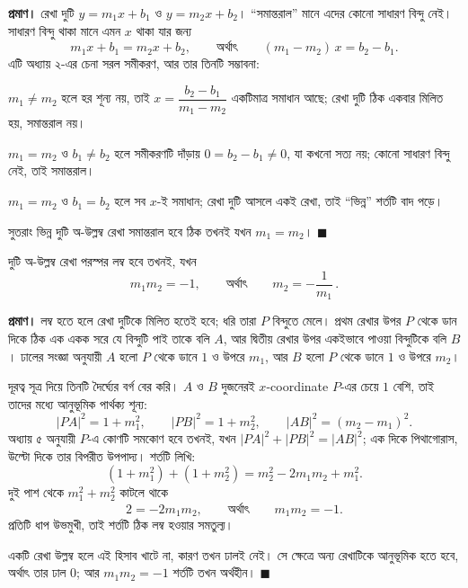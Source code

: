 \documentclass[11pt]{article}
\begin{document}
\noindent
\textbf{প্রমাণ।} রেখা দুটি $y = m_1 x + b_1$ ও $y = m_2 x + b_2$। ``সমান্তরাল''
মানে এদের কোনো সাধারণ বিন্দু নেই। সাধারণ বিন্দু থাকা মানে এমন $x$ থাকা যার
জন্য
\[
  m_1 x + b_1 = m_2 x + b_2 ,
  \qquad \text{অর্থাৎ} \qquad
  (m_1 - m_2)\,x = b_2 - b_1 .
\]
এটি অধ্যায় ২-এর চেনা সরল সমীকরণ, আর তার তিনটি সম্ভাবনা:

$m_1 \neq m_2$ হলে হর শূন্য নয়, তাই $x = \dfrac{b_2 - b_1}{m_1 - m_2}$ একটিমাত্র
সমাধান আছে; রেখা দুটি ঠিক একবার মিলিত হয়, সমান্তরাল নয়।

$m_1 = m_2$ ও $b_1 \neq b_2$ হলে সমীকরণটি দাঁড়ায় $0 = b_2 - b_1 \neq 0$, যা
কখনো সত্য নয়; কোনো সাধারণ বিন্দু নেই, তাই সমান্তরাল।

$m_1 = m_2$ ও $b_1 = b_2$ হলে সব $x$-ই সমাধান; রেখা দুটি আসলে একই রেখা, তাই
``ভিন্ন'' শর্তটি বাদ পড়ে।

সুতরাং ভিন্ন দুটি অ-উল্লম্ব রেখা সমান্তরাল হবে ঠিক তখনই যখন $m_1 = m_2$।
$\blacksquare$

\begin{idea}[লম্বের শর্ত]
দুটি অ-উল্লম্ব রেখা পরস্পর লম্ব হবে তখনই, যখন
\[
  m_1 m_2 = -1 , \qquad \text{অর্থাৎ} \qquad m_2 = -\frac{1}{m_1}\,.
\]
\end{idea}

\noindent
\textbf{প্রমাণ।} লম্ব হতে হলে রেখা দুটিকে মিলিত হতেই হবে; ধরি তারা $P$ বিন্দুতে
মেলে। প্রথম রেখার উপর $P$ থেকে ডান দিকে ঠিক এক একক সরে যে বিন্দুটি পাই তাকে
বলি $A$, আর দ্বিতীয় রেখার উপর একইভাবে পাওয়া বিন্দুটিকে বলি $B$। ঢালের
সংজ্ঞা অনুযায়ী $A$ হলো $P$ থেকে ডানে $1$ ও উপরে $m_1$, আর $B$ হলো $P$ থেকে
ডানে $1$ ও উপরে $m_2$।

দূরত্ব সূত্র দিয়ে তিনটি দৈর্ঘ্যের বর্গ বের করি। $A$ ও $B$ দুজনেরই
$x$-coordinate $P$-এর চেয়ে $1$ বেশি, তাই তাদের মধ্যে আনুভূমিক পার্থক্য শূন্য:
\[
  |PA|^2 = 1 + m_1^2 , \qquad
  |PB|^2 = 1 + m_2^2 , \qquad
  |AB|^2 = (m_2 - m_1)^2 .
\]
অধ্যায় ৫ অনুযায়ী $P$-এ কোণটি সমকোণ হবে তখনই, যখন
$|PA|^2 + |PB|^2 = |AB|^2$; এক দিকে পিথাগোরাস, উল্টো দিকে তার বিপরীত উপপাদ্য।
শর্তটি লিখি:
\[
  (1 + m_1^2) + (1 + m_2^2) = m_2^2 - 2 m_1 m_2 + m_1^2 .
\]
দুই পাশ থেকে $m_1^2 + m_2^2$ কাটলে থাকে
\[
  2 = -2 m_1 m_2 , \qquad \text{অর্থাৎ} \qquad m_1 m_2 = -1 .
\]
প্রতিটি ধাপ উভমুখী, তাই শর্তটি ঠিক লম্ব হওয়ার সমতুল্য।

একটি রেখা উল্লম্ব হলে এই হিসাব খাটে না, কারণ তখন ঢালই নেই। সে ক্ষেত্রে অন্য
রেখাটিকে আনুভূমিক হতে হবে, অর্থাৎ তার ঢাল $0$; আর $m_1 m_2 = -1$ শর্তটি তখন
অর্থহীন। $\blacksquare$

\begin{center}
\end{center}
\end{document}
